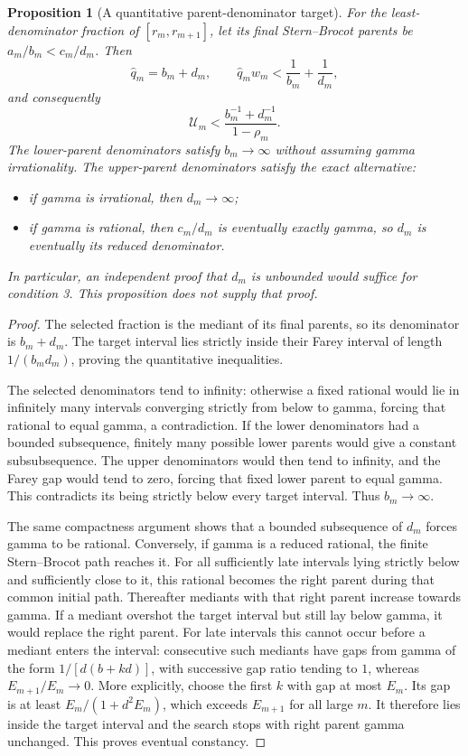 \documentclass[11pt,a4paper]{article}
\newtheorem{proposition}[theorem]{Proposition}
\theoremstyle{definition}
\theoremstyle{remark}
\begin{document}
\begin{proposition}[A quantitative parent-denominator target]
\label{stage3-farey-parent-target}
For the least-denominator fraction of $[r_m,r_{m+1}]$, let its final
Stern--Brocot parents be $a_m/b_m<c_m/d_m$. Then
\[
 \widehat q_m=b_m+d_m,\qquad
 \widehat q_m w_m<
 \frac1{b_m}+\frac1{d_m},
\]
and consequently
\begin{equation}\label{stage3-farey-parent-upper}
 \mathcal U_m<
 \frac{b_m^{-1}+d_m^{-1}}{1-\rho_m}.
\end{equation}
The lower-parent denominators satisfy $b_m\to\infty$ without assuming
gamma irrationality. The upper-parent denominators satisfy the exact
alternative:
\begin{itemize}
\item if gamma is irrational, then $d_m\to\infty$;
\item if gamma is rational, then $c_m/d_m$ is eventually exactly gamma,
so $d_m$ is eventually its reduced denominator.
\end{itemize}
In particular, an independent proof that $d_m$ is unbounded would
suffice for condition 3. This proposition does not supply that proof.
\end{proposition}

\begin{proof}
The selected fraction is the mediant of its final parents, so its
denominator is $b_m+d_m$. The target interval lies strictly inside
their Farey interval of length $1/(b_md_m)$, proving the quantitative
inequalities.

The selected denominators tend to infinity: otherwise a fixed rational
would lie in infinitely many intervals converging strictly from below
to gamma, forcing that rational to equal gamma, a contradiction.
If the lower denominators had a bounded subsequence, finitely many
possible lower parents would give a constant subsubsequence. The upper
denominators would then tend to infinity, and the Farey gap would tend
to zero, forcing that fixed lower parent to equal gamma. This contradicts
its being strictly below every target interval. Thus $b_m\to\infty$.

The same compactness argument shows that a bounded subsequence of
$d_m$ forces gamma to be rational. Conversely, if gamma is a reduced
rational, the finite Stern--Brocot path reaches it. For all sufficiently
late intervals lying strictly below and sufficiently close to it, this
rational becomes the right parent during that common initial path.
Thereafter mediants with that right parent increase towards gamma.
If a mediant overshot the target interval but still lay below gamma,
it would replace the right parent. For late intervals this cannot occur
before a mediant enters the interval: consecutive such mediants have
gaps from gamma of the form $1/[d(b+kd)]$, with successive gap ratio
tending to $1$, whereas $E_{m+1}/E_m\to0$.
More explicitly, choose the first $k$ with gap at most $E_m$.
Its gap is at least $E_m/(1+d^2E_m)$, which exceeds $E_{m+1}$ for all
large $m$. It therefore lies inside the target interval and the search
stops with right parent gamma unchanged. This proves eventual constancy.
\end{proof}
\end{document}
